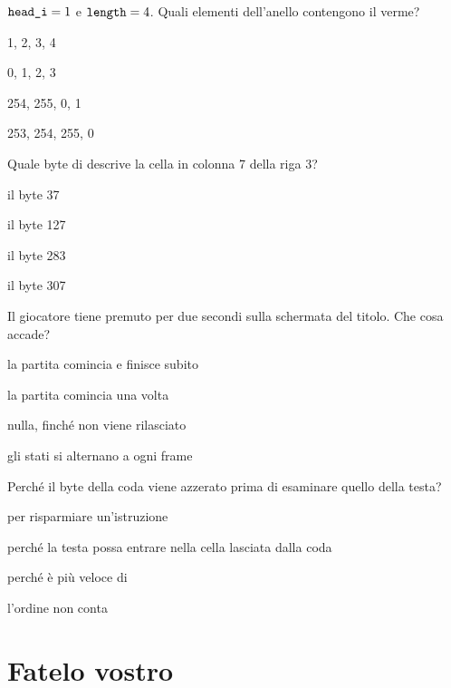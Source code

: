 \begin{quiz}{$\texttt{head\_i}=1$ e $\texttt{length}=4$. Quali elementi dell'anello contengono il verme?}
\item 1, 2, 3, 4
\item 0, 1, 2, 3
\item 254, 255, 0, 1
\item 253, 254, 255, 0
\end{quiz}

\begin{quiz}{Quale byte di  descrive la cella in colonna 7 della riga 3?}
\item il byte 37
\item il byte 127
\item il byte 283
\item il byte 307
\end{quiz}

\begin{quiz}{Il giocatore tiene premuto  per due secondi sulla schermata del titolo. Che cosa accade?}
\item la partita comincia e finisce subito
\item la partita comincia una volta
\item nulla, finché  non viene rilasciato
\item gli stati si alternano a ogni frame
\end{quiz}

\begin{quiz}{Perché il byte della coda viene azzerato prima di esaminare quello della testa?}
\item per risparmiare un'istruzione
\item perché la testa possa entrare nella cella lasciata dalla coda
\item perché  è più veloce di 
\item l'ordine non conta
\end{quiz}

\section{Fatelo vostro}

